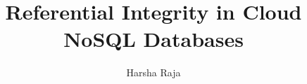 \documentclass[11pt, a4paper, twoside, openright]{report}
\title{Referential Integrity in Cloud \ac{NoSQL} Databases}
\author{Harsha Raja}
\begin{document}
\frontmatter

 

\begin{abstract}
\small
\end{abstract}

 \maketitle

\tableofcontents

 
\listoftodos



\mainmatter

\acresetall

% 
% 

% 

% 

\acresetall


% 
\acresetall 
%

\acresetall 
%
 

\backmatter


% 
% 
% 
\end{document}
